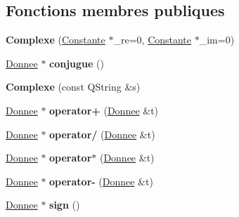 \subsection*{Fonctions membres publiques}
\begin{DoxyCompactItemize}
\item 
\hypertarget{class_complexe_a2465faa5cc94a91a261f0f7720c1553f}{{\bfseries Complexe} (\hyperlink{class_constante}{Constante} $\ast$\-\_\-re=0, \hyperlink{class_constante}{Constante} $\ast$\-\_\-im=0)}\label{class_complexe_a2465faa5cc94a91a261f0f7720c1553f}

\item 
\hypertarget{class_complexe_a8290a8acf5c2eea42f033da20924192a}{\hyperlink{class_donnee}{Donnee} $\ast$ {\bfseries conjugue} ()}\label{class_complexe_a8290a8acf5c2eea42f033da20924192a}

\item 
\hypertarget{class_complexe_a8ae4f6c56823f3dd6522883b3dbcf059}{{\bfseries Complexe} (const Q\-String \&s)}\label{class_complexe_a8ae4f6c56823f3dd6522883b3dbcf059}

\item 
\hypertarget{class_complexe_a1941d1f57fa3e45ebb2a7391e8d528e1}{\hyperlink{class_donnee}{Donnee} $\ast$ {\bfseries operator+} (\hyperlink{class_donnee}{Donnee} \&t)}\label{class_complexe_a1941d1f57fa3e45ebb2a7391e8d528e1}

\item 
\hypertarget{class_complexe_ae1f5eaa6bd60b539c8191399ffa5658d}{\hyperlink{class_donnee}{Donnee} $\ast$ {\bfseries operator/} (\hyperlink{class_donnee}{Donnee} \&t)}\label{class_complexe_ae1f5eaa6bd60b539c8191399ffa5658d}

\item 
\hypertarget{class_complexe_a7a36cc4cc516e0e4828e0e6fb16ba23c}{\hyperlink{class_donnee}{Donnee} $\ast$ {\bfseries operator$\ast$} (\hyperlink{class_donnee}{Donnee} \&t)}\label{class_complexe_a7a36cc4cc516e0e4828e0e6fb16ba23c}

\item 
\hypertarget{class_complexe_a3ff42a9947cc747c742cc2e5fcd2dab5}{\hyperlink{class_donnee}{Donnee} $\ast$ {\bfseries operator-\/} (\hyperlink{class_donnee}{Donnee} \&t)}\label{class_complexe_a3ff42a9947cc747c742cc2e5fcd2dab5}

\item 
\hypertarget{class_complexe_a0039f536b7a0e339beec2f0135573237}{\hyperlink{class_donnee}{Donnee} $\ast$ {\bfseries sign} ()}\label{class_complexe_a0039f536b7a0e339beec2f0135573237}


\end{DoxyCompactItemize}
